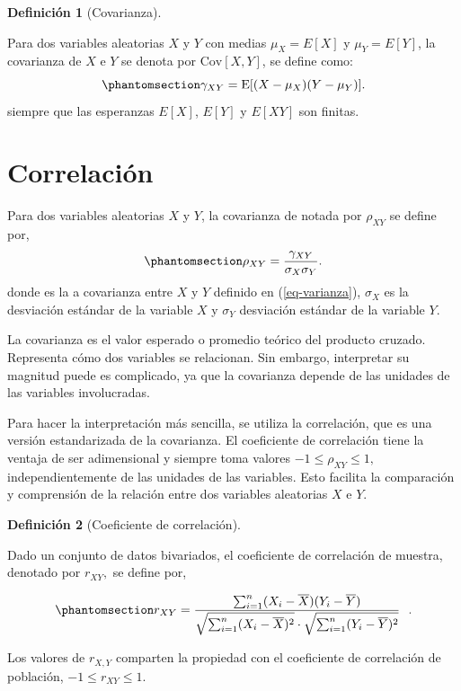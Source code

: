 \documentclass[
  us-letterpaper,
]{scrreprt}
\theoremstyle{plain}
\theoremstyle{definition}
\newtheorem{definition}{Definición}[chapter]
\theoremstyle{definition}
\theoremstyle{remark}
\begin{document}
\begin{definition}[Covarianza]\protect\hypertarget{def-cov}{}\label{def-cov}

Para dos variables aleatorias \(X\) y \(Y\) con medias \(\mu_X = E[X]\)
y \(\mu_Y= E[Y]\), la covarianza de \(X\) e \(Y\) se denota por
\(\mathrm{Cov}[X,Y]\), se define como:
\begin{equation}\phantomsection\label{eq-varianza}{
\gamma_{XY}=\mathrm E[(X-\mu_X)(Y-\mu_Y)].
}\end{equation} siempre que las esperanzas \(E[X]\), \(E[Y]\) y
\(E[XY]\) son finitas.

\end{definition}

\section{Correlación}\label{sec-correlacion}

Para dos variables aleatorias \(X\) y \(Y\), la covarianza de notada por
\(\rho_{XY}\) se define por,
\begin{equation}\phantomsection\label{eq-correlacion}{
\rho_{XY} = \dfrac{\gamma_{XY}}{\sigma_X \sigma_Y}.
}\end{equation} donde es la a covarianza entre \(X\) y \(Y\) definido en
(\ref{eq-varianza}), \(\sigma_X\) es la desviación estándar de la
variable \(X\) y \(\sigma_Y\) desviación estándar de la variable \(Y\).

La covarianza es el valor esperado o promedio teórico del producto
cruzado. Representa cómo dos variables se relacionan. Sin embargo,
interpretar su magnitud puede es complicado, ya que la covarianza
depende de las unidades de las variables involucradas.

Para hacer la interpretación más sencilla, se utiliza la correlación,
que es una versión estandarizada de la covarianza. El coeficiente de
correlación tiene la ventaja de ser adimensional y siempre toma valores
\(-1 \leq \rho_{XY} \leq 1,\) independientemente de las unidades de las
variables. Esto facilita la comparación y comprensión de la relación
entre dos variables aleatorias \(X\) e \(Y\).

\begin{definition}[Coeficiente de
correlación]\protect\hypertarget{def-coefc}{}\label{def-coefc}

Dado un conjunto de datos bivariados, el coeficiente de correlación de
muestra, denotado por \(r_{XY},\) se define por,

\begin{equation}\phantomsection\label{eq-cefcorrelacion}{ 
r_{XY} = \frac{ \sum_{i=1}^{n} (X_i - \overline{X})(Y_i - \overline{Y}) }{\sqrt{\sum_{i=1}^{n} (X_i - \overline{X})^2} \cdot \sqrt{\sum_{i=1}^{n} (Y_i - \overline{Y})^2}} \ \ .
}\end{equation}

Los valores de \(r_{X,Y}\) comparten la propiedad con el coeficiente de
correlación de población, \(-1 \leq r_{XY} \leq 1.\)

\end{definition}
\end{document}

